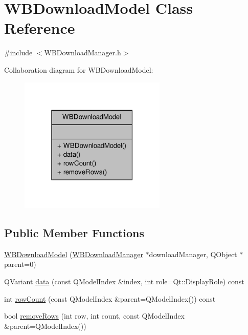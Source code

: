 \hypertarget{class_w_b_download_model}{\section{W\-B\-Download\-Model Class Reference}
\label{db/d9e/class_w_b_download_model}
}


{\ttfamily \#include $<$W\-B\-Download\-Manager.\-h$>$}



Collaboration diagram for W\-B\-Download\-Model\-:
\nopagebreak
\begin{figure}[H]
\begin{center}
\leavevmode
\includegraphics[width=198pt]{d8/d49/class_w_b_download_model__coll__graph}
\end{center}
\end{figure}
\subsection*{Public Member Functions}
\begin{DoxyCompactItemize}
\item 
\hyperlink{class_w_b_download_model_aec5696570085f68b40f276c84e9f43de}{W\-B\-Download\-Model} (\hyperlink{class_w_b_download_manager}{W\-B\-Download\-Manager} $\ast$download\-Manager, Q\-Object $\ast$parent=0)
\item 
Q\-Variant \hyperlink{class_w_b_download_model_ace6f1b922e565bddd8993af307eb321b}{data} (const Q\-Model\-Index \&index, int role=Qt\-::\-Display\-Role) const 
\item 
int \hyperlink{class_w_b_download_model_a1bddb1e72a09902bb24df9e0e4e13787}{row\-Count} (const Q\-Model\-Index \&parent=Q\-Model\-Index()) const 
\item 
bool \hyperlink{class_w_b_download_model_a561256f7726b999ca9eec7c593d232b1}{remove\-Rows} (int row, int count, const Q\-Model\-Index \&parent=Q\-Model\-Index())
\end{DoxyCompactItemize}
